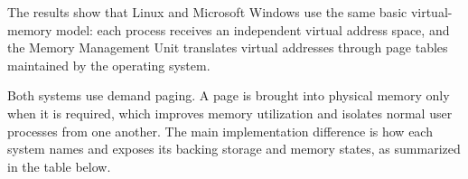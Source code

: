 
The results show that Linux and Microsoft Windows use the same basic virtual-
memory model: each process receives an independent virtual address space, and
the Memory Management Unit translates virtual addresses through page tables
maintained by the operating system.

Both systems use demand paging. A page is brought into physical memory only
when it is required, which improves memory utilization and isolates normal user
processes from one another. The main implementation difference is how each
system names and exposes its backing storage and memory states, as summarized
in the table below.
